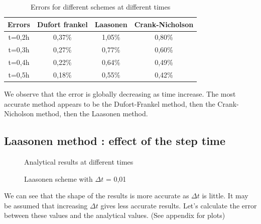 \documentclass{article}
\begin{document}
            \begin{table}[H]
                \centering
                \caption{Errors for different schemes at different times}
                \begin{tabular}{|c|c|c|c|}
                \hline
                Errors & Dufort frankel & Laasonen & Crank-Nicholson \\ \hline
                t=0,2h & 0,37\%         & 1,05\%   & 0,80\%          \\ \hline
                t=0,3h & 0,27\%         & 0,77\%   & 0,60\%          \\ \hline
                t=0,4h & 0,22\%         & 0,64\%   & 0,49\%          \\ \hline
                t=0,5h & 0,18\%         & 0,55\%   & 0,42\%          \\ \hline
                \end{tabular}
            \end{table}
    
            We observe that the error is globally decreasing as time increase. The most accurate method appears to 
            be the Dufort-Frankel method, then the Crank-Nicholson method, then the Laasonen method.
    
            \subsection{Laasonen method : effect of the step time}
            \begin{figure}[H]
                \caption{Analytical results at different times}
            \end{figure}
            \begin{figure}[H]
                \caption{Laasonen scheme with $\Delta t$ = 0,01}
            \end{figure}
            
            We can see that the shape of the results is more accurate as $\Delta t$ is little.
            It may be assumed that increasing $\Delta t$ gives less accurate results.
            Let's calculate the error between these values and the analytical values. (See appendix for plots)
    
\end{document}
